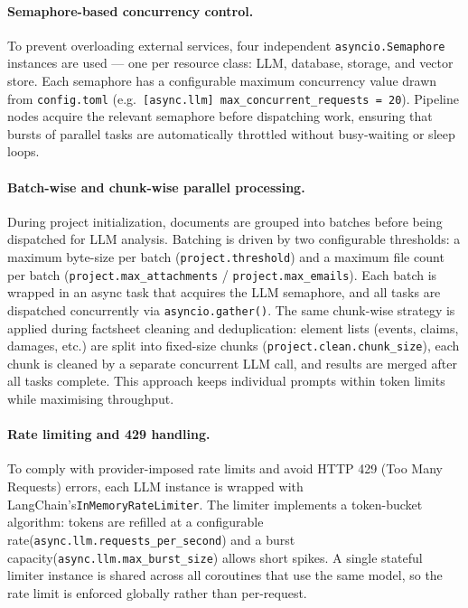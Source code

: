 \paragraph{Semaphore-based concurrency control.}
To prevent overloading external services, four independent \texttt{asyncio.Semaphore} instances are used — one per resource class: LLM, database, storage, and vector store. Each semaphore has a configurable maximum concurrency value drawn from \texttt{config.toml} (e.g.\ \texttt{[async.llm] max\_concurrent\_requests = 20}). Pipeline nodes acquire the relevant semaphore before dispatching work, ensuring that bursts of parallel tasks are automatically throttled without busy-waiting or sleep loops.

\paragraph{Batch-wise and chunk-wise parallel processing.}
During project initialization, documents are grouped into batches before being dispatched for LLM analysis. Batching is driven by two configurable thresholds: a maximum byte-size per batch (\texttt{project.threshold}) and a maximum file count per batch (\texttt{project.max\_attachments} / \texttt{project.max\_emails}). Each batch is wrapped in an async task that acquires the LLM semaphore, and all tasks are dispatched concurrently via \texttt{asyncio.gather()}. The same chunk-wise strategy is applied during factsheet cleaning and deduplication: element lists (events, claims, damages, etc.) are split into fixed-size chunks (\texttt{project.clean.chunk\_size}), each chunk is cleaned by a separate concurrent LLM call, and results are merged after all tasks complete. This approach keeps individual prompts within token limits while maximising throughput.

\paragraph{Rate limiting and 429 handling.}
To comply with provider-imposed rate limits and avoid HTTP 429 (Too Many Requests) errors, each LLM instance is wrapped with LangChain's\linebreak\texttt{InMemoryRateLimiter}. The limiter implements a token-bucket algorithm: tokens are refilled at a configurable rate\linebreak(\texttt{async.llm.requests\_per\_second}) and a burst capacity\linebreak(\texttt{async.llm.max\_burst\_size}) allows short spikes. A single stateful limiter instance is shared across all coroutines that use the same model, so the rate limit is enforced globally rather than per-request.

